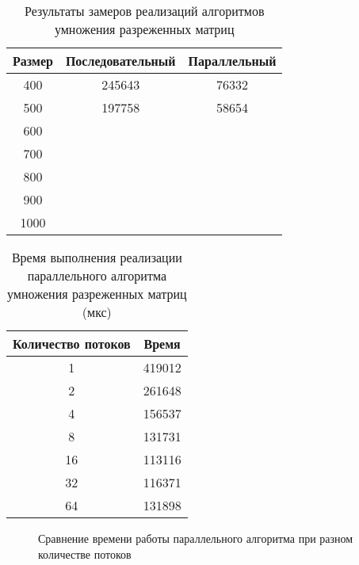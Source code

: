 \begin{table}[h]
	\begin{center}
		\caption{Результаты замеров реализаций алгоритмов умножения разреженных матриц}
		\label{tbl:random}
		\begin{tabular}{|c|c|c|}
			\hline
			Размер & Последовательный & Параллельный \\
			\hline
			400 &  245643 & 76332\\
			\hline
			500 &  197758 & 58654\\
			\hline
			600 &   & \\
			\hline
			700 &   & \\
			\hline
			800 &   & \\
			\hline
			900 &   & \\
			\hline
			1000 &   & \\
			\hline
		\end{tabular}
	\end{center}
	
\end{table}
\FloatBarrier



\begin{table}[h]
	\begin{center}
		\caption{ Время выполнения реализации параллельного алгоритма умножения разреженных матриц (мкс)}
		\label{tbl:random}
		\begin{tabular}{|c|c|}
			\hline
			Количество потоков & Время \\
			\hline
			1 &  419012\\
			\hline
			2 &  261648\\
			\hline
			4 &  156537\\
			\hline
			8 &  131731\\
			\hline
			16 &  113116\\
			\hline
			32 &  116371\\
			\hline
			64 &  131898\\
			\hline
		\end{tabular}
	\end{center}
\end{table}
\FloatBarrier

\begin{figure}[h]
	\captionsetup{singlelinecheck = false, justification=centering}
	\centering
	\caption{Сравнение времени работы параллельного алгоритма при разном количестве потоков}
	\label{time_best}
\end{figure}

